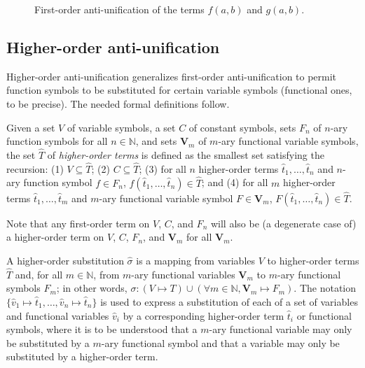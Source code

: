 \begin{figure}[t]
\centering{}
\caption{First-order anti-unification of the terms $f(a,b)$ and $g(a,b)$.\label{fig:first-anti-uni}}
\end{figure}

\subsection{Higher-order anti-unification}

Higher-order anti-unification generalizes first-order anti-unification to permit function symbols to be substituted for certain variable symbols (functional ones, to be precise).  The needed formal definitions follow.

\begin{defn}\label{def:hterm}
Given a set $V$ of variable symbols, a set $C$ of constant symbols, sets $F_n$ of $n$-ary function symbols for all $n\in\mathbb{N}$, and sets $\mathbf{V}_m$ of $m$-ary functional variable symbols, the set $\hat{T}$ of \emph{higher-order terms} is defined as the smallest set satisfying the recursion: (1) $V\subseteq \hat{T}$; (2) $C\subseteq \hat{T}$; (3) for all $n$ higher-order terms $\hat{t}_1, \ldots, \hat{t}_n$ and $n$-ary function symbol $f\in F_n$,  $f(\hat{t}_1, \ldots, \hat{t}_n) \in \hat{T}$; and (4) for all $m$ higher-order terms $\hat{t}_1, \ldots, \hat{t}_m$ and $m$-ary functional variable symbol $F\in \mathbf{V}_m$,  $F(\hat{t}_1, \ldots, \hat{t}_n) \in \hat{T}$.
\end{defn}

Note that any first-order term on $V$, $C$, and $F_n$ will also be (a degenerate case of) a higher-order term on $V$, $C$, $F_n$, and $\mathbf{V}_m$ for all $\mathbf{V}_m$.

\begin{defn}\label{def:substitution}
A higher-order substitution $\hat{\sigma}$ is a mapping from variables $V$ to higher-order terms $\hat{T}$ and, for all $m\in\mathbb{N}$, from $m$-ary functional variables $\mathbf{V}_m$ to $m$-ary functional symbols $F_m$; in other words, $\sigma: (V\mapsto T)\cup(\forall m\in \mathbb{N}, \mathbf{V}_m\mapsto F_m)$. The notation $\{\hat{v}_1 \mapsto \hat{t}_1, \ldots, \hat{v}_n \mapsto \hat{t}_n\}$ is used to express a substitution of each of a set of variables and functional variables $\hat{v}_i$ by a corresponding higher-order term $\hat{t}_i$ or functional symbols, where it is to be understood that a $m$-ary functional variable may only be substituted by a $m$-ary functional symbol and that a variable may only be substituted by a higher-order term.
\end{defn}

